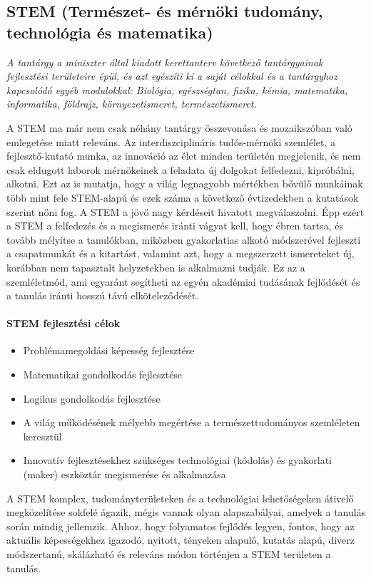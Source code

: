 \subsection[STEM]{STEM	(Természet- és mérnöki	tudomány, technológia és
  matematika)}
\emph{A tantárgy a miniszter által kiadott kerettanterv következő tantárgyainak
  fejlesztési területeire épül, és azt egészíti ki a saját célokkal és a
  tantárgyhoz kapcsolódó egyéb modulokkal:
  Biológia, egészségtan, fizika, kémia, matematika, informatika, földrajz,
  környezetismeret, természetismeret.}

A STEM ma már nem csak néhány tantárgy összevonása és  mozaikszóban való
emlegetése miatt releváns. Az interdiszciplináris tudós-mérnöki szemlélet, a
fejlesztő-kutató munka, az innováció az élet minden területén megjelenik, és
nem csak eldugott laborok mérnökeinek a feladata új dolgokat felfedezni,
kipróbálni, alkotni. Ezt az is mutatja, hogy a világ legnagyobb mértékben
bővülő munkáinak több mint fele STEM-alapú és ezek száma a következő
évtizedekben a kutatások szerint nőni fog. A STEM a jövő nagy kérdéseit
hivatott megválaszolni. Épp ezért a STEM a felfedezés és a megismerés iránti
vágyat kell, hogy ébren tartsa, és tovább mélyítse a tanulókban, miközben
gyakorlatias alkotó módszerével fejleszti a csapatmunkát és a kitartást,
valamint azt, hogy a megszerzett ismereteket új, korábban nem tapasztalt
helyzetekben is alkalmazni tudják. Ez az a szemléletmód, ami egyaránt segítheti
az egyén akadémiai tudásának fejlődését és a tanulás iránti hosszú távú
elköteleződését.

\paragraph{STEM fejlesztési célok}
\begin{itemize}
  \item Problémamegoldási képesség fejlesztése
  \item  Matematikai gondolkodás fejlesztése
  \item  Logikus gondolkodás fejlesztése
  \item  A világ működésének mélyebb megértése a természettudományos szemléleten
        keresztül
  \item  Innovatív fejlesztésekhez szükséges technológiai (kódolás) és gyakorlati
        (maker) eszköztár megismerése és alkalmazása
\end{itemize}

A STEM komplex, tudományterületeken és a technológiai lehetőségeken átivelő
megközelítése sokfelé ágazik, mégis vannak olyan alapszabályai, amelyek a
tanulás során mindig jellemzik. Ahhoz, hogy folyamatos fejlődés legyen, fontos,
hogy az aktuális képességekhez igazodó, nyitott, tényeken alapuló, kutatás
alapú, diverz módszertanú, skálázható és releváns módon történjen a STEM
területen a tanulás.

